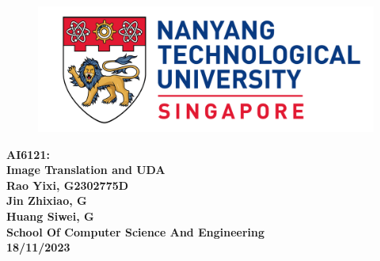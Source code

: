 \begin{titlepage}

\begin{figure}[H]
\centering
\includegraphics[width=\textwidth]{Title/logo.png}
\caption*{}\label{fig:entropy} 
\end{figure}

\centering
\LARGE{\textbf{AI6121:}}\\
\LARGE{\textbf{Image Translation and UDA}}\\[2.0in]

\large{\textbf{Rao Yixi, G2302775D}}\\
\large{\textbf{Jin Zhixiao, G}}\\
\large{\textbf{Huang Siwei, G}}\\[1in]

\textbf{School Of Computer Science And Engineering}\\[0.75in]

\textbf{18/11/2023}
\newpage
\end{titlepage}